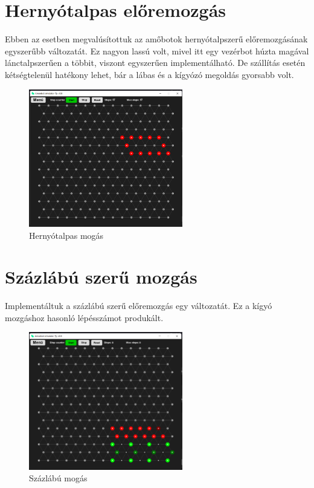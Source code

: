 \documentclass[	
  noindent
]{elteikthesis}[2024/04/26]
\begin{document}
  \section{Hernyótalpas előremozgás}
    Ebben az esetben megvalúsítottuk az amőbotok hernyótalpszerű előremozgásának egyszerűbb változatát. Ez nagyon lassú volt, mivel itt egy vezérbot húzta magával lánctalpszerűen a többit, viszont egyszerűen implementálható. De szállítás esetén kétségtelenül hatékony lehet, bár a lábas és a kígyózó megoldás gyorsabb volt.

    \begin{figure}[H]
      \centering
      \includegraphics[width=0.6\textwidth]{images/mesurements/03_rawler.png}
      \caption{Hernyótalpas mogás}
      \label{fig:03_rawler}
    \end{figure}
    
  \section{Százlábú szerű mozgás}
    Implementáltuk a százlábú szerű előremozgás egy változatát. Ez a kígyó mozgáshoz hasonló lépésszámot produkált.
    \begin{figure}[H]
      \centering
      \includegraphics[width=0.6\textwidth]{images/mesurements/04_caterpillar.png}
      \caption{Százlábú mogás}
      \label{fig:04_caterpillar}
    \end{figure}
\end{document}
